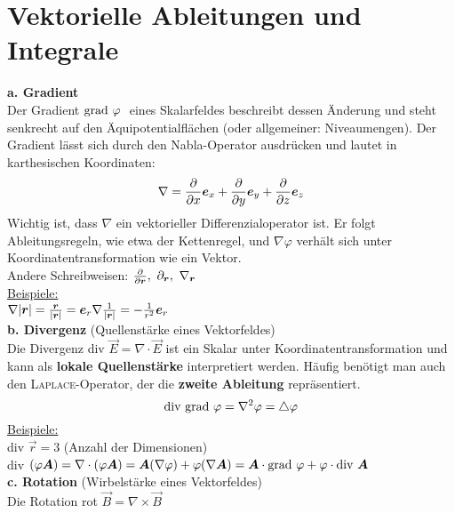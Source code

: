 \section{Vektorielle Ableitungen und Integrale}
\textbf{a. Gradient}\\
\linebreak
Der Gradient $\grad\varphi\ $ eines Skalarfeldes beschreibt dessen Änderung und steht senkrecht auf den Äquipotentialflächen (oder allgemeiner: Niveaumengen). Der Gradient lässt sich durch den Nabla-Operator ausdrücken und lautet in karthesischen Koordinaten: 
\begin{equation*}
\nabla=\pdiff{}{x}\vec{e}_x+\pdiff{}{y}\vec{e}_y+\pdiff{}{z}\vec{e}_z
\end{equation*}
Wichtig ist, dass $\nabla$ ein vektorieller Differenzialoperator ist. Er folgt Ableitungsregeln, wie etwa der Kettenregel, und $\nabla\varphi$ verhält sich unter Koordinatentransformation wie ein Vektor.\\
\linebreak
Andere Schreibweisen: $\pdiff{}{\vec{r}},\ \partial_{\vec{r}},\ \nabla_{\vec{r}}$\\
\linebreak
\underline{Beispiele:}\\
\linebreak
$\nabla |\vec{r}|=\frac{\vec{r}}{|\vec{r}|}=\vec{e}_r\\
\nabla \frac{1}{|\vec{r}|}=-\frac{1}{r^2}\vec{e}_r$\\
\linebreak\linebreak
\textbf{b. Divergenz} (Quellenstärke eines Vektorfeldes)\\
\linebreak
Die Divergenz div $\vec{E}=\nabla\cdot\vec{E}$ ist ein Skalar unter Koordinatentransformation und kann als \textbf{lokale Quellenstärke} interpretiert werden. Häufig benötigt man auch den \textsc{Laplace}-Operator, der die \textbf{zweite Ableitung} repräsentiert.\\
\begin{equation*}
\div\grad \varphi=\nabla^2\varphi=\bigtriangleup\varphi
\end{equation*}
\underline{Beispiele:}\\
\linebreak
div $\vec{r}=3$ (Anzahl der Dimensionen)\\
div $(\varphi\vec{A})=\nabla\cdot(\varphi\vec{A})=\vec{A}(\nabla\varphi)+\varphi(\nabla\vec{A})=\vec{A}\cdot\grad \varphi+\varphi\cdot\div\vec{A}$\\
\linebreak
\textbf{c. Rotation} (Wirbelstärke eines Vektorfeldes)\\
\linebreak
Die Rotation rot $\vec{B}=\nabla\times\vec{B}$

